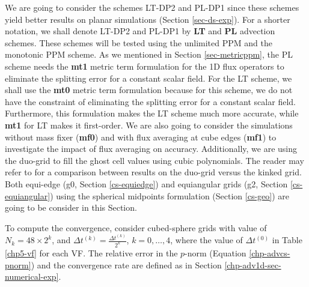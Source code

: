 We are going to consider the schemes LT-DP2 and PL-DP1 since these schemes yield better results on planar simulations (Section \ref{sec-ds-exp}).
For a shorter notation, we shall denote LT-DP2 and PL-DP1 by \textbf{LT} and \textbf{PL} advection schemes. 
These schemes will be tested using the unlimited PPM  and the monotonic PPM scheme.
As we mentioned in Section \ref{sec-metricppm}, the PL scheme needs the \textbf{mt1} 
metric term formulation for the 1D flux operators to eliminate the splitting error for a constant scalar field.
For the LT scheme, we shall use the \textbf{mt0} metric term formulation because for this scheme, 
we do not have the constraint of eliminating the splitting error for a constant scalar field. 
Furthermore, this formulation makes the LT scheme much more accurate, while \textbf{mt1} for LT makes it first-order.
We are also going to consider the simulations without mass fixer (\textbf{mf0}) and with flux averaging at
cube edges (\textbf{mf1}) to investigate the impact of flux averaging on accuracy.
Additionally, we are using the duo-grid to fill the ghost cell values using cubic polynomials.
The reader may refer to \citet{mouallem:2023} for a comparison between results on the duo-grid versus the kinked grid.
Both equi-edge (g0, Section \ref{cs-equiedge}) and equiangular grids (g2, Section \ref{cs-equiangular})
using the spherical midpoints formulation (Section \ref{cs-geo}) are going to be consider in this Section.

To compute the convergence, consider cubed-sphere grids with value of $N_k =  48\times2^{k}$,
and $\Delta t^{(k)} = \frac{\Delta t^{(k)}}{2^k}$, $k=0, \ldots, 4$, where
the value of $\Delta t^{(0)}$ in Table \ref{chp5-vf} for each VF.
The relative error in the $p$-norm (Equation \eqref{chp-advcs-pnorm})
and the convergence rate are defined as in Section \ref{chp-adv1d-sec-numerical-exp}.

\newpage
